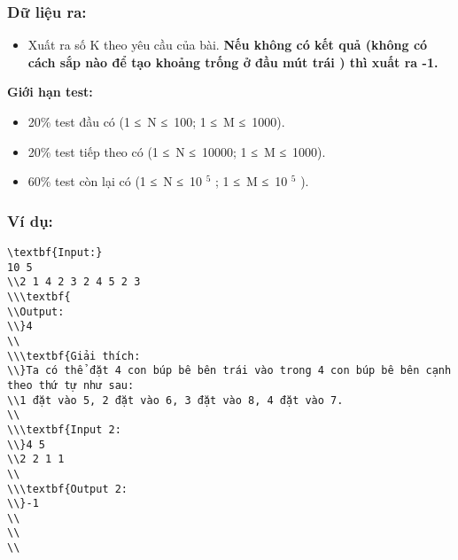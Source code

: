 \subsubsection{   Dữ liệu ra:  }
\begin{itemize}
	\item     Xuất ra số K theo yêu cầu của bài.    \textbf{     Nếu không có kết quả (không có cách sắp nào để tạo khoảng trống ở đầu mút trái ) thì xuất ra -1.    }
\end{itemize}

\textbf{     Giới hạn test:    }
\begin{itemize}
	\item      20\% test đầu có (1 ≤ N ≤ 100; 1 ≤ M ≤ 1000).    
	\item      20\% test tiếp theo có           (1 ≤ N ≤ 10000; 1 ≤ M ≤ 1000).     
	\item        60\% test còn lại có (1 ≤ N ≤ 10       $^        5       $       ; 1 ≤ M ≤ 10       $^        5       $       ).      
\end{itemize}
\begin{itemize}
\end{itemize}

\subsubsection{   Ví dụ:  }
\begin{verbatim}
\textbf{Input:}
10 5
\\2 1 4 2 3 2 4 5 2 3
\\\textbf{
\\Output:
\\}4
\\
\\\textbf{Giải thích: 
\\}Ta có thể đặt 4 con búp bê bên trái vào trong 4 con búp bê bên cạnh theo thứ tự như sau: 
\\1 đặt vào 5, 2 đặt vào 6, 3 đặt vào 8, 4 đặt vào 7.
\\
\\\textbf{Input 2:
\\}4 5
\\2 2 1 1
\\
\\\textbf{Output 2:
\\}-1
\\
\\
\\\end{verbatim}